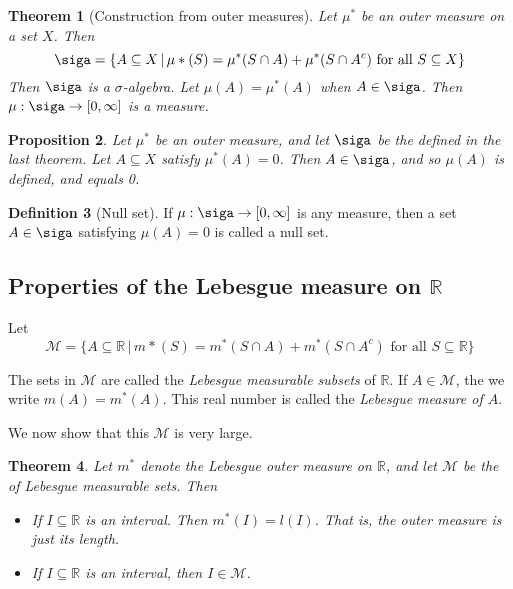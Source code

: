 \documentclass[10pt, oneside, reqno]{amsart}
\theoremstyle{plain}%
\newtheorem{thm}{Theorem}[section]
\newtheorem{prop}[thm]{Proposition}
\theoremstyle{definition}
\newtheorem{defn}[thm]{Definition}
\theoremstyle{remark}
\newcommand{\given}{ \, | \,}
\newcommand{\R}{\mathbb{R}}
\begin{document}
\begin{thm}[Construction from outer measures]
    Let $\mu^*$ be an outer measure on a set $X$.  Then \[
        \siga = \{ A \subseteq X \given \mu*(S) = \mu^*(S \cap A) + \mu^*(S \cap A^c) \text{ for all } S \subseteq X \}
    \]
    Then $\siga$ is a $\sigma$-algebra.  Let $\mu(A) = \mu^*(A)$ when $A \in \siga$.  Then $\mu : \siga \rightarrow [0,\infty]$ is a measure.
\end{thm}

\begin{prop}
    Let $\mu^*$ be an outer measure, and let $\siga$ be the \sig defined in the last theorem.  Let $A \subseteq X$ satisfy $\mu^*(A) = 0$.  Then $A \in \siga$, and so $\mu(A)$ is defined, and equals 0.   
\end{prop}

\begin{defn}[Null set]
    If $\mu: \siga \rightarrow [0,\infty]$ is any measure, then a set $A \in \siga$ satisfying $\mu(A) = 0$ is called a null set.
\end{defn}


\subsection{Properties of the Lebesgue measure on $\R$} %
\label{sub:properties_of_the_lebesgue_measure_on_r_}
Let \[
\mathcal{M} = \{ A \subseteq \R \given m*(S) = m^*(S \cap A) + m^*(S \cap A^c) \text{ for all } S \subseteq \R \}
\]

The sets in $\mathcal{M}$ are called the \emph{Lebesgue measurable subsets} of $\R$.  If $A \in \mathcal{M}$, the we write $m(A) = m^*(A)$.  This real number is called the \emph{Lebesgue measure of $A$}.  

We now show that this \sig $\mathcal{M}$ is very large.

\begin{thm}Let $m^*$ denote the Lebesgue outer measure on $\R$, and let $\mathcal{M}$ be the \sig of Lebesgue measurable sets.  Then 
    \begin{itemize}
        \item If $I \subseteq \R$ is an interval.  Then $m^*(I) = l(I)$.  That is, the outer measure is just its length.
        \item If $I \subseteq \R$ is an interval, then $I \in \mathcal{M}$.
    \end{itemize}
    
\end{thm}
\end{document}

